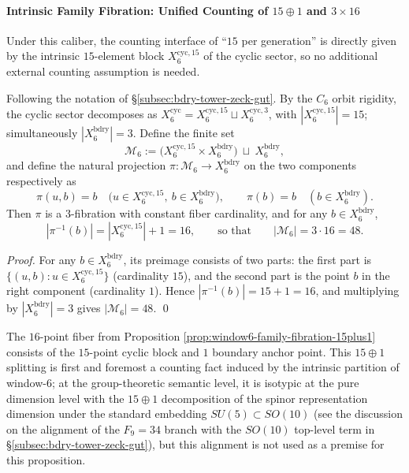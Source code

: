 \paragraph{Intrinsic Family Fibration: Unified Counting of \texorpdfstring{$15\oplus 1$}{15+1} and \texorpdfstring{$3\times 16$}{3x16}}
Under this caliber, the counting interface of ``\(15\) per generation'' is directly given by the intrinsic \(15\)-element block \(X_6^{\mathrm{cyc},15}\) of the cyclic sector, so no additional external counting assumption is needed.
\begin{proposition}\label{prop:window6-family-fibration-15plus1}
Following the notation of \S\ref{subsec:bdry-tower-zeck-gut}.
By the \(C_6\) orbit rigidity, the cyclic sector decomposes as \(X_6^{\mathrm{cyc}}=X_6^{\mathrm{cyc},15}\sqcup X_6^{\mathrm{cyc},3}\), with \(|X_6^{\mathrm{cyc},15}|=15\); simultaneously \(|X_6^{\mathrm{bdry}}|=3\).
Define the finite set
\[
\mathcal M_6
:=\bigl(X_6^{\mathrm{cyc},15}\times X_6^{\mathrm{bdry}}\bigr)\ \sqcup\ X_6^{\mathrm{bdry}},
\]
and define the natural projection \(\pi:\mathcal M_6\to X_6^{\mathrm{bdry}}\) on the two components respectively as
\[
\pi(u,b)=b\quad\bigl(u\in X_6^{\mathrm{cyc},15},\ b\in X_6^{\mathrm{bdry}}\bigr),\qquad
\pi(b)=b\quad(b\in X_6^{\mathrm{bdry}}).
\]
Then \(\pi\) is a \(3\)-fibration with constant fiber cardinality, and for any \(b\in X_6^{\mathrm{bdry}}\),
\[
|\pi^{-1}(b)|=|X_6^{\mathrm{cyc},15}|+1=16,
\qquad\text{so that}\qquad
|\mathcal M_6|=3\cdot 16=48.
\]
\end{proposition}
\begin{proof}
For any \(b\in X_6^{\mathrm{bdry}}\), its preimage consists of two parts:
the first part is \(\{(u,b):u\in X_6^{\mathrm{cyc},15}\}\) (cardinality \(15\)), and the second part is the point \(b\) in the right component (cardinality \(1\)).
Hence \(|\pi^{-1}(b)|=15+1=16\), and multiplying by \(|X_6^{\mathrm{bdry}}|=3\) gives \(|\mathcal M_6|=48\). \qed
\end{proof}

\begin{remark}[On the Dimensional Alignment of \texorpdfstring{$16=15\oplus 1$}{16=15+1}]\label{rem:window6-15plus1-dim-alignment}
The \(16\)-point fiber from Proposition \ref{prop:window6-family-fibration-15plus1} consists of the \(15\)-point cyclic block and \(1\) boundary anchor point.
This \(15\oplus 1\) splitting is first and foremost a counting fact induced by the intrinsic partition of window-\(6\);
at the group-theoretic semantic level, it is isotypic at the pure dimension level with the \(15\oplus 1\) decomposition of the spinor representation dimension under the standard embedding \(SU(5)\subset SO(10)\) (see the discussion on the alignment of the \(F_9=34\) branch with the \(SO(10)\) top-level term in \S\ref{subsec:bdry-tower-zeck-gut}), but this alignment is not used as a premise for this proposition.
\end{remark}

